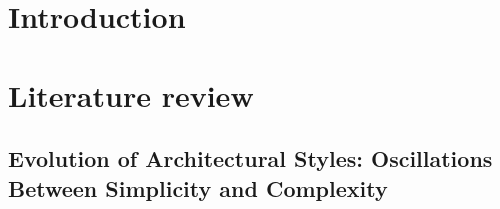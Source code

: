 %


\begin{linenumbers}


\section{Introduction}
\label{sec:1Introduction}



\section{Literature review}
\label{sec:LiteratureReview}


\subsection{Evolution of Architectural Styles: Oscillations Between Simplicity and Complexity}
\label{subsec:TimelineArchitectureStyles}



\end{linenumbers}
